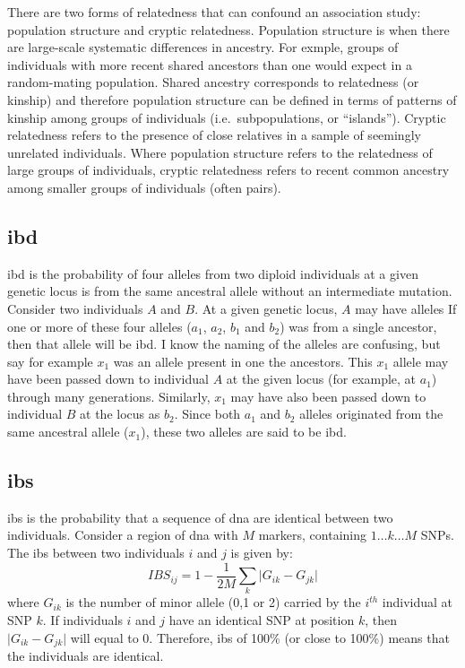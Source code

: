 There are two forms of relatedness that can confound an association study: population structure and cryptic relatedness.
Population structure is when there are large-scale systematic differences in ancestry.
For exmple, groups of individuals with more recent shared ancestors than one would expect in a random-mating population.
Shared ancestry corresponds to relatedness (or kinship) and therefore population structure can be defined in terms of patterns of kinship among groups of individuals (i.e.\ subpopulations, or ``islands'').
Cryptic relatedness refers to the presence of close relatives in a sample of seemingly unrelated individuals.
Where population structure refers to the relatedness of large groups of individuals, cryptic relatedness refers to recent common ancestry among smaller groups of individuals (often pairs).





\subsection{\Acrfull{ibd}}
\label{sub:ibd}

\Gls{ibd} is the probability of four alleles from two diploid individuals at a given genetic locus is from the same ancestral allele without an intermediate mutation.
Consider two individuals $A$ and $B$.
At a given genetic locus, $A$ may have alleles 
If one or more of these four alleles ($a_1$,  $a_2$, $b_1$ and  $b_2$) was from a single ancestor, then that allele will be \gls{ibd}.
I know the naming of the alleles are confusing, but say for example $x_1$ was an allele present in one the ancestors.
This $x_1$ allele may have been passed down to individual $A$ at the given locus (for example, at $a_1$) through many generations.
Similarly, $x_1$ may have also been passed down to individual $B$ at the locus as $b_2$.
Since both $a_1$ and $b_2$ alleles originated from the same ancestral allele ($x_1$), these two alleles are said to be \gls{ibd}.

\subsection{\Acrfull{ibs}}
\label{sub:ibs}

\Gls{ibs} is the probability that a sequence of \acrshort{dna}  are identical between two individuals.
Consider a region of \acrshort{dna} with $M$ markers, containing $1\dots k\dots M$ SNPs.
The \gls{ibs} between two individuals $i$ and $j$ is given by:
\begin{equation*}
	IBS_{ij} = 1 - \frac{1}{2M}\sum_k \lvert G_{ik} - G_{jk} \rvert
\end{equation*}
where $G_{ik}$ is the number of minor allele (0,1 or 2) carried by the $i^{th}$ individual at SNP $k$.
If individuals $i$ and $j$ have an identical SNP at position $k$, then $\lvert G_{ik} - G_{jk} \rvert$ will equal to 0.
Therefore, \gls{ibs} of 100\% (or close to 100\%) means that the individuals are identical.

